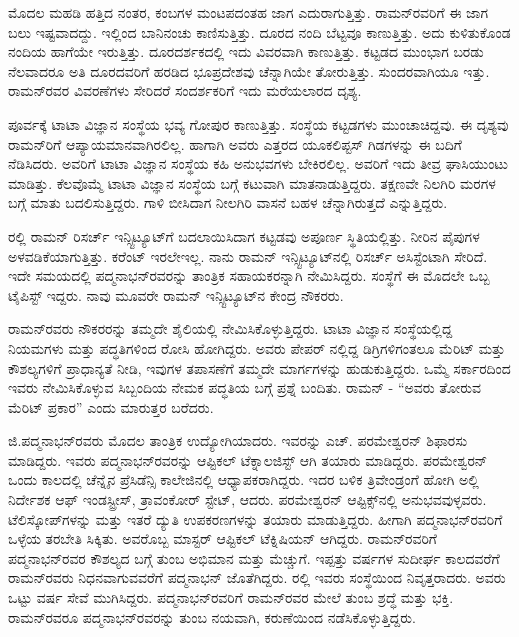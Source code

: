 ಮೊದಲ ಮಹಡಿ ಹತ್ತಿದ ನಂತರ, ಕಂಬಗಳ ಮಂಟಪದಂತಹ ಜಾಗ ಎದುರಾಗುತ್ತಿತ್ತು. ರಾಮನ್‍ರವರಿಗೆ ಈ ಜಾಗ ಬಲು ಇಷ್ಟವಾದದ್ದು. ಇಲ್ಲಿಂದ ಬಾನಿನಂಚು ಕಾಣಿಸುತ್ತಿತ್ತು. ದೂರದ ನಂದಿ ಬೆಟ್ಟವೂ ಕಾಣುತ್ತಿತ್ತು. ಅದು ಕುಳಿತುಕೊಂಡ ನಂದಿಯ ಹಾಗೆಯೇ ಇರುತ್ತಿತ್ತು. ದೂರದರ್ಶಕದಲ್ಲಿ ಇದು ವಿವರವಾಗಿ ಕಾಣುತ್ತಿತ್ತು. ಕಟ್ಟಡದ ಮುಂಭಾಗ ಬರಡು ನೆಲವಾದರೂ ಅತಿ ದೂರದವರಿಗೆ ಹರಡಿದ ಭೂಪ್ರದೇಶವು ಚೆನ್ನಾಗಿಯೇ ತೋರುತ್ತಿತ್ತು. ಸುಂದರವಾಗಿಯೂ ಇತ್ತು. ರಾಮನ್‍ರವರ ವಿವರಣೆಗಳು ಸೇರಿದರೆ ಸಂದರ್ಶಕರಿಗೆ ಇದು ಮರೆಯಲಾರದ ದೃಶ್ಯ.

ಪೂರ್ವಕ್ಕೆ ಟಾಟಾ ವಿಜ್ಞಾನ ಸಂಸ್ಥೆಯ ಭವ್ಯ ಗೋಪುರ ಕಾಣುತ್ತಿತ್ತು. ಸಂಸ್ಥೆಯ ಕಟ್ಟಡಗಳು ಮುಂಚಾಚಿದ್ದವು. ಈ ದೃಶ್ಯವು ರಾಮನ್‍ರಿಗೆ ಆಪ್ಯಾಯಮಾನವಾಗಿರಲಿಲ್ಲ. ಹಾಗಾಗಿ ಅವರು ಎತ್ತರದ ಯೂಕಲಿಪ್ಟಸ್ ಗಿಡಗಳನ್ನು ಈ ಬದಿಗೆ ನೆಡಿಸಿದರು. ಅವರಿಗೆ ಟಾಟಾ ವಿಜ್ಞಾನ ಸಂಸ್ಥೆಯ ಕಹಿ ಅನುಭವಗಳು ಬೇಕಿರಲಿಲ್ಲ. ಅವರಿಗೆ ಇದು ತೀವ್ರ ಘಾಸಿಯುಂಟು ಮಾಡಿತ್ತು. ಕೆಲವೊಮ್ಮೆ ಟಾಟಾ ವಿಜ್ಞಾನ ಸಂಸ್ಥೆಯ ಬಗ್ಗೆ ಕಟುವಾಗಿ ಮಾತನಾಡುತ್ತಿದ್ದರು. ತಕ್ಷಣವೇ ನಿಲಗಿರಿ ಮರಗಳ ಬಗ್ಗೆ ಮಾತು ಬದಲಿಸುತ್ತಿದ್ದರು. ಗಾಳಿ ಬೀಸಿದಾಗ ನೀಲಗಿರಿ ವಾಸನೆ ಬಹಳ ಚೆನ್ನಾಗಿರುತ್ತದೆ ಎನ್ನುತ್ತಿದ್ದರು.

ರಲ್ಲಿ ರಾಮನ್ ರಿಸರ್ಚ್ ಇನ್ಸ್ಟಿಟ್ಯೂಟ್‍ಗೆ ಬದಲಾಯಿಸಿದಾಗ ಕಟ್ಟಡವು ಅಪೂರ್ಣ ಸ್ಥಿತಿಯಲ್ಲಿತ್ತು. ನೀರಿನ ಪೈಪುಗಳ ಅಳವಡಿಕೆಯಾಗುತ್ತಿತ್ತು. ಕರೆಂಟ್ ಇರಲೇಇಲ್ಲ. ನಾನು ರಾಮನ್ ಇನ್ಸ್ಟಿಟ್ಯೂಟ್‍ನಲ್ಲಿ ರಿಸರ್ಚ್ ಅಸಿಸ್ಟೆಂಟಾಗಿ ಸೇರಿದೆ. ಇದೇ ಸಮಯದಲ್ಲಿ ಪದ್ಮನಾಭನ್‍ರವರನ್ನು ತಾಂತ್ರಿಕ ಸಹಾಯಕರನ್ನಾಗಿ ನೇಮಿಸಿದ್ದರು. ಸಂಸ್ಥೆಗೆ ಈ ಮೊದಲೇ ಒಬ್ಬ ಟೈಪಿಸ್ಟ್ ಇದ್ದರು. ನಾವು ಮೂವರೇ ರಾಮನ್ ಇನ್ಸ್ಟಿಟ್ಯೂಟ್‍ನ ಕೇಂದ್ರ ನೌಕರರು.

ರಾಮನ್‍ರವರು ನೌಕರರನ್ನು ತಮ್ಮದೇ ಶೈಲಿಯಲ್ಲಿ ನೇಮಿಸಿಕೊಳ್ಳುತ್ತಿದ್ದರು. ಟಾಟಾ ವಿಜ್ಞಾನ ಸಂಸ್ಥೆಯಲ್ಲಿದ್ದ ನಿಯಮಗಳು ಮತ್ತು ಪದ್ಧತಿಗಳಿಂದ ರೋಸಿ ಹೋಗಿದ್ದರು. ಅವರು ಪೇಪರ್ ನಲ್ಲಿದ್ದ ಡಿಗ್ರಿಗಳಿಗಂತಲೂ ಮೆರಿಟ್ ಮತ್ತು ಕೌಶಲ್ಯಗಳಿಗೆ ಪ್ರಾಧಾನ್ಯತೆ ನೀಡಿ, ಇವುಗಳ ತಪಾಸಣೆಗೆ ತಮ್ಮದೇ ಮಾರ್ಗಗಳನ್ನು ಹುಡುಕುತ್ತಿದ್ದರು. ಒಮ್ಮೆ ಸರ್ಕಾರದಿಂದ ಇವರು ನೇಮಿಸಿಕೊಳ್ಳುವ ಸಿಬ್ಬಂದಿಯ ನೇಮಕ ಪದ್ಧತಿಯ ಬಗ್ಗೆ ಪ್ರಶ್ನೆ ಬಂದಿತು. ರಾಮನ್ - “ಅವರು ತೋರುವ ಮೆರಿಟ್ ಪ್ರಕಾರ” ಎಂದು ಮಾರುತ್ತರ ಬರೆದರು.

ಜಿ.ಪದ್ಮನಾಭನ್‍ರವರು ಮೊದಲ ತಾಂತ್ರಿಕ ಉದ್ಯೋಗಿಯಾದರು. ಇವರನ್ನು ಎಚ್. ಪರಮೇಶ್ವರನ್ ಶಿಫಾರಸು ಮಾಡಿದ್ದರು. ಇವರು ಪದ್ಮನಾಭನ್‍ರವರನ್ನು ಆಪ್ಟಿಕಲ್ ಟೆಕ್ನಾಲಜಿಸ್ಟ್ ಆಗಿ ತಯಾರು ಮಾಡಿದ್ದರು. ಪರಮೇಶ್ವರನ್ ಒಂದು ಕಾಲದಲ್ಲಿ ಚೆನ್ನೈನ ಪ್ರೆಸಿಡೆನ್ಸಿ ಕಾಲೇಜಿನಲ್ಲಿ ಆಧ್ಯಾಪಕರಾಗಿದ್ದರು. ಇದರ ಬಳಿಕ ತ್ರಿವೇಂಡ್ರಂಗೆ ಹೋಗಿ ಅಲ್ಲಿ ನಿರ್ದೇಶಕ ಆಫ್ ಇಂಡಸ್ಟ್ರೀಸ್, ತ್ರಾವಂಕೋರ್ ಸ್ಟೇಟ್, ಆದರು. ಪರಮೇಶ್ವರನ್ ಆಪ್ಟಿಕ್ಸ್‌ನಲ್ಲಿ ಅನುಭವವುಳ್ಳವರು. ಟೆಲಿಸ್ಕೋಪ್‍ಗಳನ್ನು ಮತ್ತು ಇತರೆ ದ್ಯುತಿ ಉಪಕರಣಗಳನ್ನು ತಯಾರು ಮಾಡುತ್ತಿದ್ದರು. ಹೀಗಾಗಿ ಪದ್ಮನಾಭನ್‍ರವರಿಗೆ ಒಳ್ಳೆಯ ತರಬೇತಿ ಸಿಕ್ಕಿತು. ಅವರೊಬ್ಬ ಮಾಸ್ಟರ್ ಆಪ್ಟಿಕಲ್ ಟೆಕ್ನಿಷಿಯನ್ ಆಗಿದ್ದರು. ರಾಮನ್‍ರವರಿಗೆ ಪದ್ಮನಾಭನ್‍ರವರ ಕೌಶಲ್ಯದ ಬಗ್ಗೆ ತುಂಬ ಅಭಿಮಾನ ಮತ್ತು ಮೆಚ್ಚುಗೆ. ಇಪ್ಪತ್ತು ವರ್ಷಗಳ ಸುದೀರ್ಘ ಕಾಲದವರೆಗೆ ರಾಮನ್‍ರವರು ನಿಧನವಾಗುವವರೆಗೆ ಪದ್ಮನಾಭನ್ ಜೊತೆಗಿದ್ದರು. ರಲ್ಲಿ ಇವರು ಸಂಸ್ಥೆಯಿಂದ ನಿವೃತ್ತರಾದರು. ಅವರು ಒಟ್ಟು  ವರ್ಷ ಸೇವೆ ಮುಗಿಸಿದ್ದರು. ಪದ್ಮನಾಭನ್‍ರವರಿಗೆ ರಾಮನ್‍ರವರ ಮೇಲೆ ತುಂಬ ಶ್ರದ್ಧೆ ಮತ್ತು ಭಕ್ತಿ. ರಾಮನ್‍ರವರೂ ಪದ್ಮನಾಭನ್‍ರವರನ್ನು ತುಂಬ ನಯವಾಗಿ, ಕರುಣೆಯಿಂದ ನಡೆಸಿಕೊಳ್ಳುತ್ತಿದ್ದರು.

